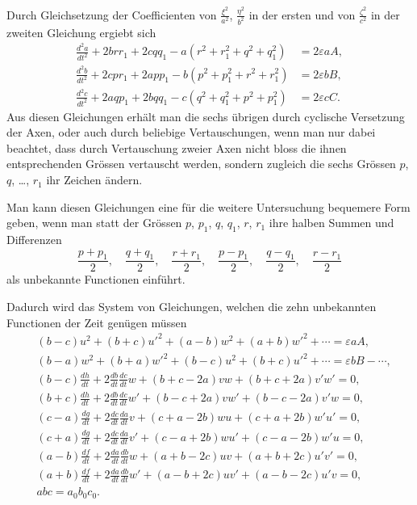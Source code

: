 \documentclass[12pt,a4paper]{book}
\theoremstyle{definition}
\theoremstyle{remark}
\begin{document}
Durch Gleichsetzung der Coefficienten von $\frac{\xi^{2}}{a^{2}}$, $\frac{\eta^{2}}{b^{2}}$ in der ersten und von $\frac{\zeta^{2}}{c^{2}}$ in der zweiten Gleichung ergiebt sich
\begin{align*}
\frac{d^{2}a}{dt^{2}} + 2brr_{1} + 2cqq_{1} - a(r^{2} + r_{1}^{2} + q^{2} + q_{1}^{2}) &= 2\varepsilon aA,\\
\frac{d^{2}b}{dt^{2}} + 2cpr_{1} + 2app_{1} - b(p^{2} + p_{1}^{2} + r^{2} + r_{1}^{2}) &= 2\varepsilon bB,\\
\frac{d^{2}c}{dt^{2}} + 2aqp_{1} + 2bqq_{1} - c(q^{2} + q_{1}^{2} + p^{2} + p_{1}^{2}) &= 2\varepsilon cC.\tag{a}
\end{align*}
Aus diesen Gleichungen erh\"alt man die sechs \"ubrigen durch cyclische Versetzung der Axen, oder auch durch beliebige Vertauschungen, wenn man nur dabei beachtet, dass durch Vertauschung zweier Axen nicht bloss die ihnen entsprechenden Gr\"ossen vertauscht werden, sondern zugleich die sechs Gr\"ossen $p$, $q$, \dots, $r_{1}$ ihr Zeichen \"andern.

Man kann diesen Gleichungen eine f\"ur die weitere Untersuchung bequemere Form geben, wenn man statt der Gr\"ossen $p$, $p_{1}$, $q$, $q_{1}$, $r$, $r_{1}$ ihre halben Summen und Differenzen
\[
\frac{p + p_{1}}{2},\quad \frac{q + q_{1}}{2},\quad \frac{r + r_{1}}{2},\quad \frac{p - p_{1}}{2},\quad \frac{q - q_{1}}{2},\quad \frac{r - r_{1}}{2}
\]
als unbekannte Functionen einf\"uhrt.

Dadurch wird das System von Gleichungen, welchen die zehn unbekannten Functionen der Zeit gen\"ugen m\"ussen
\begin{align*}
&(b - c)u^{2} + (b + c)u'^{2} + (a - b)w^{2} + (a + b)w'^{2} + \cdots = \varepsilon aA,\\
&(b - a)w^{2} + (b + a)w'^{2} + (b - c)u^{2} + (b + c)u'^{2} + \cdots = \varepsilon bB - \cdots,\\
&(b - c)\frac{dh}{dt} + 2\frac{db}{dt}\frac{dc}{dt}w + (b + c - 2a)vw + (b + c + 2a)v'w' = 0,\\
&(b + c)\frac{dh}{dt} + 2\frac{db}{dt}\frac{dc}{dt}w' + (b - c + 2a)vw' + (b - c - 2a)v'w = 0,\\
&(c - a)\frac{dg}{dt} + 2\frac{dc}{dt}\frac{da}{dt}v + (c + a - 2b)wu + (c + a + 2b)w'u' = 0,\\
&(c + a)\frac{dg}{dt} + 2\frac{dc}{dt}\frac{da}{dt}v' + (c - a + 2b)wu' + (c - a - 2b)w'u = 0,\\
&(a - b)\frac{df}{dt} + 2\frac{da}{dt}\frac{db}{dt}w + (a + b - 2c)uv + (a + b + 2c)u'v' = 0,\\
&(a + b)\frac{df}{dt} + 2\frac{da}{dt}\frac{db}{dt}w' + (a - b + 2c)uv' + (a - b - 2c)u'v = 0,\\
&abc = a_{0}b_{0}c_{0}.
\end{align*}
\end{document}
